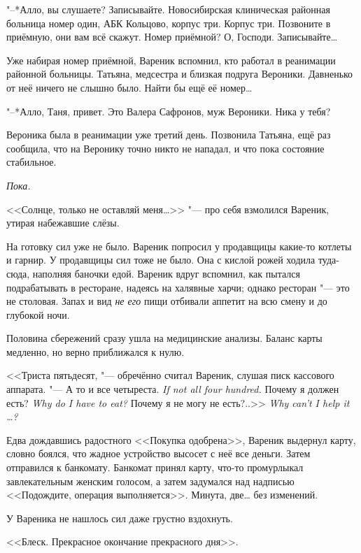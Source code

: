 "--*Алло, вы слушаете?
Записывайте.
Новосибирская клиническая районная больница номер один, АБК Кольцово, корпус три.
Корпус три.
Позвоните в приёмную, они вам всё скажут.
Номер приёмной?
О, Господи.
Записывайте\ldots{}

Уже набирая номер приёмной, Вареник вспомнил, кто работал в реанимации районной больницы.
Татьяна, медсестра и близкая подруга Вероники.
Давненько от неё ничего не слышно было.
Найти бы ещё её номер\ldots{}

"--*Алло, Таня, привет.
Это Валера Сафронов, муж Вероники.
Ника у тебя?

\asterism

\textspace

\label{Wed_2012_06_13}

Вероника была в реанимации уже третий день.
Позвонила Татьяна, ещё раз сообщила, что на Веронику точно никто не нападал, и что пока состояние стабильное.

\emph{Пока.}

<<Солнце, только не оставляй меня\ldots{}>> "--- про себя взмолился Вареник, утирая набежавшие слёзы.

На готовку сил уже не было.
Вареник попросил у продавщицы какие-то котлеты и гарнир.
У продавщицы сил тоже не было.
Она с кислой рожей ходила туда-сюда, наполняя баночки едой.
Вареник вдруг вспомнил, как пытался подрабатывать в ресторане, надеясь на халявные харчи;
однако ресторан "--- это не столовая.
Запах и вид \emph{не его} пищи отбивали аппетит на всю смену и до глубокой ночи.

Половина сбережений сразу ушла на медицинские анализы.
Баланс карты медленно, но верно приближался к нулю.

<<Триста пятьдесят, "--- обречённо считал Вареник, слушая писк кассового аппарата.
{"--- А то и все четыреста.}
{\textit{If not all four hundred.}}
{Почему я должен есть?}
{\textit{Why do I have to eat?}}
{Почему я не могу не есть?..>>}
{\textit{Why can't I help it \ldots{}?}}

Едва дождавшись радостного <<Покупка одобрена>>, Вареник выдернул карту, словно боялся, что жадное устройство высосет с неё все деньги.
Затем отправился к банкомату.
Банкомат принял карту, что-то промурлыкал завлекательным женским голосом, а затем задумался над надписью <<Подождите, операция выполняется>>.
Минута, две\ldots{} без изменений.

У Вареника не нашлось сил даже грустно вздохнуть.

<<Блеск.
Прекрасное окончание прекрасного дня>>.

